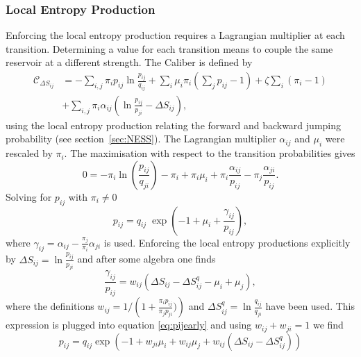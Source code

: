 \subsubsection{Local Entropy Production}
Enforcing the local entropy production requires a Lagrangian multiplier at each transition. Determining a value for each transition means to couple the same reservoir at a different strength. 
The Caliber is defined by
 \begin{equation}
\begin{aligned}
 \mathcal{C}_{\Delta S_{ij}} &= -\sum_{i,j} \pi_i p_{ij} \ln \frac{p_{ij}}{q_{ij}} 
      +  \sum_i \mu_i \pi_i \left( \sum_j p_{ij} - 1 \right) + \zeta \sum_i ( \pi_i -1) \\
    &+ \sum_{i,j} \pi_i \alpha_{ij} \left ( \ln \frac{p_{ij}}{p_{ji}} -  \Delta S_{ij}  \right ),
\end{aligned}
\end{equation}
using the local entropy production relating the forward and backward 
jumping probability (see section~\ref{sec:NESS}). The Lagrangian multiplier $\alpha_{ij}$ and $\mu_i$ were rescaled by $\pi_i$.   
The maximisation with respect to the transition probabilities gives
  \begin{equation}
    0 = - \pi_i \ln \left ( \frac{p_{ij}}{q_{ji}} \right ) - \pi_i + \pi_i     \mu_i + \pi_i \frac{ \alpha_{ij} }{p_{ij}} - \pi_j \frac{ \alpha_{ji} }{p_{ij}}.
  \end{equation}
Solving for $p_{ij}$ with $\pi_i \neq 0$ 
  \begin{equation}
  p_{ij} = q_{ij} \; \exp \left ( -1 + \mu_i  + \frac{\gamma_{ij}}{p_{ij}} \right ),
\label{eq:pijearly}
  \end{equation}
where $\gamma_{ij} = \alpha_{ij} - \frac{\pi_j}{\pi_i} \alpha_{ji}$ is used.
Enforcing the local entropy productions explicitly by $\Delta S_{ij} = \ln \frac{p_{ij}}{p_{ji}}$ and after some algebra one finds
\begin{equation}
 \frac{\gamma_{ij}}{p_{ij}} = w_{ij} \left ( \Delta S_{ij} - \Delta S_{ij}^q -\mu_i + \mu_j \right ),
\end{equation}
where the definitions $w_{ij} = 1/\left(1 + \frac{\pi_i p_{ij}}{\pi_j p_{ji}} ) \right)$ and 
$\Delta S_{ij}^q = \ln \frac{q_{ij}}{q_{ji}} $ have been used. This expression is plugged into equation \ref{eq:pijearly} and using $w_{ij} + w_{ji} =1$ we  find
\begin{equation}
 p_{ij} = q_{ij} \exp \left ( -1 + w_{ji} \mu_i + w_{ij} \mu_j + w_{ij} (\Delta S_{ij} -\Delta S_{ij}^q)  \right ) 
\label{eq:pij2early}
\end{equation}
